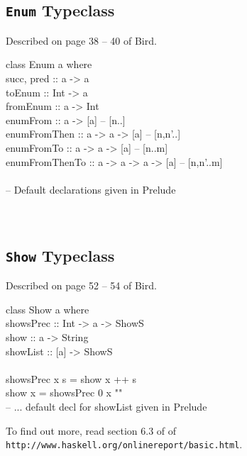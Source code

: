 \documentclass[11pt]{article}
\begin{document}
\subsection{{\tt{Enum}} Typeclass}

Described on page 38 -- 40 of Bird.

\begin{program*}
\> class  Enum a  where   \\
\>     succ, pred     :: a -> a   \\
\>     toEnum         :: Int -> a   \\
\>     fromEnum       :: a -> Int   \\
\>     enumFrom       :: a -> [a]            -- [n..]   \\
\>     enumFromThen   :: a -> a -> [a]       -- [n,n'..]   \\
\>     enumFromTo     :: a -> a -> [a]       -- [n..m]   \\
\>     enumFromThenTo :: a -> a -> a -> [a]  -- [n,n'..m]   \\
\>    \\
\>     -- Default declarations given in Prelude   \\
\>    \\
\>    \\
\end{program*}

\subsection{{\tt{Show}} Typeclass}

Described on page 52 -- 54 of Bird.

\begin{program*}
\> class  Show a  where   \\
\>     showsPrec :: Int -> a -> ShowS   \\
\>     show      :: a -> String    \\
\>     showList  :: [a] -> ShowS   \\
\>    \\
\>     showsPrec \underline{\hspace{1em}} x s   = show x ++ s   \\
\>     show x            = showsPrec 0 x ""   \\
\>     -- ... default decl for showList given in Prelude   \\
\end{program*}

To find out more, read section 6.3 of of {\tt{http://www.haskell.org/onlinereport/basic.html}}. 



\end{document}
